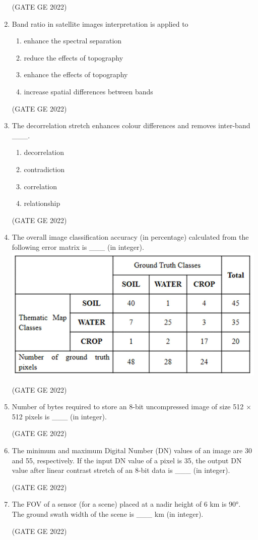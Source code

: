 \documentclass[a4paper, 11pt]{article}
\begin{document}
\begin{enumerate}
\hfill (GATE GE 2022)

\item Band ratio in satellite images interpretation is applied to
\begin{enumerate}
    \item enhance the spectral separation
    \item reduce the effects of topography
    \item enhance the effects of topography
    \item increase spatial differences between bands
\end{enumerate}

\hfill (GATE GE 2022)

\item The decorrelation stretch enhances colour differences and removes inter-band \_\_\_.
\begin{enumerate}
    \item decorrelation
    \item contradiction
    \item correlation
    \item relationship
\end{enumerate}

\hfill (GATE GE 2022)

\item The overall image classification accuracy (in percentage) calculated from the following error matrix is \_\_\_ (in integer).
\centering \includegraphics[width=\columnwidth]{figs/fig_81.png}

\hfill (GATE GE 2022)

\item Number of bytes required to store an 8-bit uncompressed image of size 512 × 512 pixels is \_\_\_ (in integer).

\hfill (GATE GE 2022)

\item The minimum and maximum Digital Number (DN) values of an image are 30 and 55, respectively. If the input DN value of a pixel is 35, the output DN value after linear contrast stretch of an 8-bit data is \_\_\_ (in integer).

\hfill (GATE GE 2022)

\item The FOV of a sensor (for a scene) placed at a nadir height of 6 km is 90°. The ground swath width of the scene is \_\_\_ km (in integer).

\hfill (GATE GE 2022)

\end{enumerate}
\end{document}
